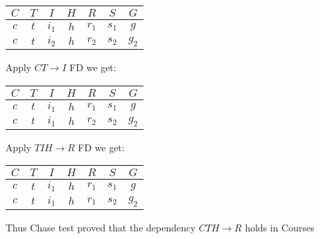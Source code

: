 

\begin{tabular}{ c | c | c | c | c | c | c }
  $C$ & $T$ & $I$ & $H$ & $R$ & $S$ & $G$ \\ 
  \hline\hline
  $c$ & $t$ & $i_1$ & $h$ & $r_1$ & $s_1$ & $g$\\
  \hline 
  $c$ & $t$ & $i_2$ & $h$ & $r_2$ & $s_2$ & $g_2$\\
\end{tabular}

Apply $CT \rightarrow I$ FD we get:\\

\begin{tabular}{ c | c | c | c | c | c | c }
  $C$ & $T$ & $I$ & $H$ & $R$ & $S$ & $G$ \\ 
  \hline\hline
  $c$ & $t$ & $i_1$ & $h$ & $r_1$ & $s_1$ & $g$\\
  \hline 
  $c$ & $t$ & $i_1$ & $h$ & $r_2$ & $s_2$ & $g_2$\\
\end{tabular}

Apply $TIH \rightarrow R$ FD we get:\\

\begin{tabular}{ c | c | c | c | c | c | c }
  $C$ & $T$ & $I$ & $H$ & $R$ & $S$ & $G$ \\ 
  \hline\hline
  $c$ & $t$ & $i_1$ & $h$ & $r_1$ & $s_1$ & $g$\\
  \hline 
  $c$ & $t$ & $i_1$ & $h$ & $r_1$ & $s_2$ & $g_2$\\
\end{tabular}


Thus Chase test  proved that the dependency $CTH \rightarrow R$ holds in Courses